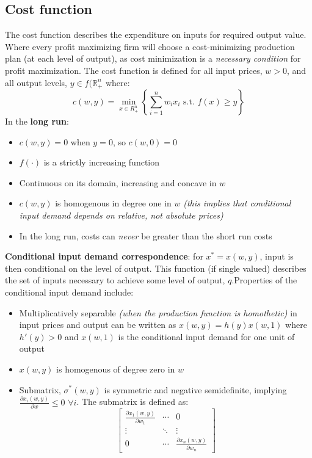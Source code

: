 \documentclass{article}
\begin{document}
\subsection{Cost function}
The cost function describes the expenditure on inputs for required output value. Where every profit maximizing firm will choose a cost-minimizing production plan (at each level of output), as cost minimization is a \textit{necessary condition} for profit maximization. The cost function is defined for all input prices, $w > 0$, and all output levels, $y \in f(\mathbb{R}_+^n$ where:
    \[
    c(w,y) = \min_{x \in R_{+}^n} \left\{ \sum_{i=1}^n w_ix_i \text{ s.t. } f(x) \geq y \right\}
    \]
In the \textbf{long run}: 
    \begin{itemize}
        \item $c(w,y) = 0$ when $y=0$, so $c(w,0) = 0$
        \item $f(\cdot)$ is a strictly increasing function
        \item Continuous on its domain, increasing and concave in $w$
        \item $c(w,y)$ is homogenous in degree one in $w$ \textit{(this implies that conditional input demand depends on relative, not absolute prices)}
        \item In the long run, costs can \textit{never} be greater than the short run costs
        \end{itemize}
    \textbf{Conditional input demand correspondence}: for $x^* = x(w,y)$, input is then conditional on the level of output. This function (if single valued) describes the set of inputs necessary to achieve some level of output, $q$.Properties of the conditional input demand include: 
        \begin{itemize}
            \item Multiplicatively separable \textit{(when the production function is homothetic)} in input prices and output can be written as $x(w,y) = h(y)x(w,1)$ where $h'(y) > 0$ and $x(w,1)$ is the conditional input demand for one unit of output
            \item $x(w,y)$ is homogenous of degree zero in $w$
            \item Submatrix, $\sigma^*(w,y)$ is symmetric and negative semidefinite, implying $\frac{\partial x_i(w,y)}{\partial w} \leq 0$ $\forall i$. The submatrix is defined as: 
            \[
                \begin{bmatrix}
                \frac{\partial x_1(w, y)}{\partial w_1} & \cdots & 0 \\
                \vdots & \ddots & \vdots \\
                0 & \cdots & \frac{\partial x_n(w, y)}{\partial w_n}
                \end{bmatrix}
                \]
        \end{itemize}
        
\end{document}
